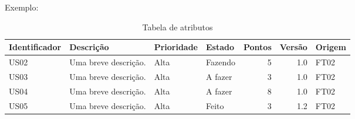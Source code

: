 Exemplo:

\begin{table}[h]
\centering
\caption{Tabela de atributos}
\label{atributos}
    \begin{tabular}{l|l|l|l|r|r|l}
    Identificador & Descrição & Prioridade & Estado & Pontos & Versão & Origem \\
    \hline
    US02 & Uma breve descrição. & Alta & Fazendo & 5 & 1.0 & FT02\\
    US03 & Uma breve descrição. & Alta & A fazer & 3 & 1.0 & FT02\\
    US04 & Uma breve descrição. & Alta & A fazer  & 8 & 1.0 & FT02\\
    US05 & Uma breve descrição. & Alta & Feito  & 3 & 1.2 & FT02
    \end{tabular}
\end{table}

